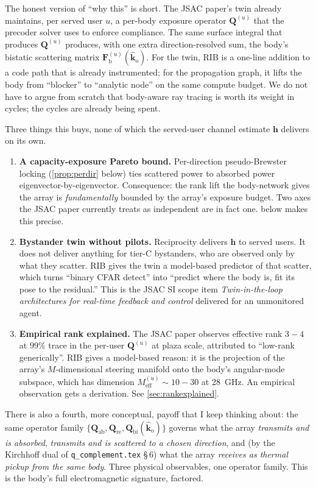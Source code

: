 \documentclass[11pt,a4paper]{article}
\theoremstyle{definition}
\newcommand{\Qabs}{\mathbf{Q}_{\mathrm{ab}}}
\newcommand{\Qref}{\mathbf{Q}_{\mathrm{re}}}
\newcommand{\kout}{\hat{\bm{k}}_{\mathrm{o}}}
\newcommand{\Frib}{\mathbf{F}_{\mathrm{b}}}
\newcommand{\Qbist}{\mathbf{Q}_{\mathrm{bi}}}
\newcommand{\hh}{\mathbf{h}}
\begin{document}
The honest version of ``why this'' is short.  The JSAC paper's twin
already maintains, per served user $u$, a per-body exposure operator
$\mathbf{Q}^{(u)}$ that the precoder solver uses to enforce
compliance.  The same surface integral that produces
$\mathbf{Q}^{(u)}$ produces, with one extra direction-resolved sum,
the body's bistatic scattering matrix $\Frib^{(u)}(\kout)$.  For the
twin, RIB is a one-line addition to a code path that is already
instrumented; for the propagation graph, it lifts the body from
``blocker'' to ``analytic node'' on the same compute budget.  We do
not have to argue from scratch that body-aware ray tracing is worth
its weight in cycles; the cycles are already being spent.

Three things this buys, none of which the served-user channel
estimate $\hh$ delivers on its own.

\begin{enumerate}[leftmargin=1.6em,itemsep=3pt]
\item \textbf{A capacity-exposure Pareto bound.}  Per-direction
pseudo-Brewster locking (\cref{prop:perdir} below) ties scattered
power to absorbed power eigenvector-by-eigenvector.  Consequence:
the rank lift the body-network gives the array is
\emph{fundamentally} bounded by the array's exposure budget.  Two
axes the JSAC paper currently treats as independent are in fact one.
 below makes this precise.
\item \textbf{Bystander twin without pilots.}  Reciprocity
delivers $\hh$ to served users.  It does not deliver anything for
tier-C bystanders, who are observed only by what they scatter.
RIB gives the twin a model-based predictor of that scatter, which
turns ``binary CFAR detect'' into ``predict where the body is, fit
its pose to the residual.''  This is the JSAC SI scope item
\textit{Twin-in-the-loop architectures for real-time feedback and
control} delivered for an unmonitored agent.
\item \textbf{Empirical rank explained.}  The JSAC paper
observes effective rank $3{-}4$ at $99\%$ trace in the per-user
$\mathbf{Q}^{(u)}$ at plaza scale, attributed to ``low-rank
generically''.  RIB gives a model-based reason: it is the
projection of the array's $M$-dimensional steering manifold onto
the body's angular-mode subspace, which has dimension
$M_{\mathrm{eff}}^{(u)}\sim 10{-}30$ at \SI{28}{GHz}.  An empirical
observation gets a derivation.  See \cref{sec:rankexplained}.
\end{enumerate}

There is also a fourth, more conceptual, payoff that I keep thinking
about: the same operator family $\{\Qabs,\Qref,\Qbist(\kout)\}$
governs what the array \emph{transmits and is absorbed},
\emph{transmits and is scattered to a chosen direction}, and (by the
Kirchhoff dual of \texttt{q\_complement.tex} \S\,6) what the array
\emph{receives as thermal pickup from the same body}.  Three
physical observables, one operator family.  This is the body's full
electromagnetic signature, factored.
\end{document}
